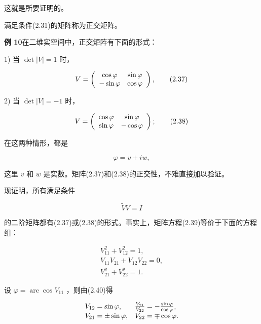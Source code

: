这就是所要证明的。

满足条件(2.31)的矩阵称为正交矩阵。

\textbf{例 10}\quad 在二维实空间中，正交矩阵有下面的形式：

1) 当 $\operatorname{det}|V| = 1$ 时，

\begin{equation*}
V = \left( \begin{array}{c c} \cos \varphi & \sin \varphi \\ - \sin \varphi & \cos \varphi \end{array} \right),\tag{2.37}
\end{equation*}

2) 当 $\operatorname{det}|V| = -1$ 时，

\begin{equation*}
V = \left( \begin{array}{c c} \cos \varphi & \sin \varphi \\ \sin \varphi & - \cos \varphi \end{array} \right);\tag{2.38}
\end{equation*}

在这两种情形，都是

\begin{equation*}
\varphi = v + i w,
\end{equation*}

这里 $v$ 和 $w$ 是实数。矩阵(2.37)和(2.38)的正交性，不难直接加以验证。

现证明，所有满足条件

\begin{equation*}
\widetilde {V} V = I\tag{2.39}
\end{equation*}

的二阶矩阵都有(2.37)或(2.38)的形式。事实上，矩阵方程(2.39)等价于下面的方程组：

\begin{equation*}
\begin{array}{l} V _ {1 1} ^ {2} + V _ {1 2} ^ {2} = 1, \\ V _ {1 1} V _ {2 1} + V _ {1 2} V _ {2 2} = 0, \\ V _ {2 1} ^ {2} + V _ {2 2} ^ {2} = 1. \end{array}\tag{2.40}
\end{equation*}

设 $\varphi = \operatorname{arc}\cos V_{11}$ ，则由(2.40)得

\begin{equation*}
\begin{array}{l l} V _ {1 2} = \sin \varphi , & \frac {V _ {2 1}}{V _ {2 2}} = - \frac {\sin \varphi}{\cos \varphi}, \\ V _ {2 1} = \pm \sin \varphi , & V _ {2 2} = \mp \cos \varphi . \end{array}
\end{equation*}

